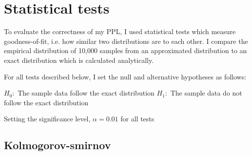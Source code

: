 


\section{Statistical tests}
To evaluate the correctness of my PPL, I used statistical tests which measure goodness-of-fit, i.e. how similar two distributions are to each other. I compare the empirical distribution of 10,000 samples from an approximated distribution to an exact distribution which is calculated analytically. 

For all tests described below, I set the null and alternative hypotheses as follows:

$H_0:$ The sample data follow the exact distribution
$H_1:$ The sample data do not follow the exact distribution

Setting the significance level, $\alpha = 0.01$ for all tests

\subsection{Kolmogorov-smirnov}
\subsection{}